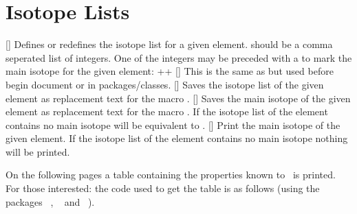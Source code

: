 \documentclass[load-preamble+]{cnltx-doc}
\begin{document}
\section{Isotope Lists}

\begin{commands}
  []
    Defines or redefines the isotope list for a given element.   should be a comma seperated list of integers.  One of the integers
    may be preceded with a \code{!} to mark the main isotope for the given
    element: \verbcode++
  []
    This is the same as  but used before begin document or
    in packages/classes.
  []
    Saves the isotope list of the given element as replacement text for the
    macro .
  []
    Saves the main isotope of the given element as replacement text for the
    macro .  If the isotope list of the element contains no main
    isotope  will be equivalent to .
  []
    Print the main isotope of the given element.  If the
    isotope list of the element contains no main isotope nothing will be
    printed.
\end{commands}

\begin{example}
  \ttfamily
  \saveelementisotopes{}
  \meaning\foo\par
  \savemainelementisotope{}
  \meaning\foo\par
  \normalfont
\end{example}

\clearpage


On the following pages a table containing the properties known to \elements\
is printed. For those interested: the code used to get the table is as follows
(using the packages \pkg{lscape}~\cite{pkg:lscape},
~\cite{pkg:longtable} and ~\cite{pkg:booktabs}).
\end{document}
